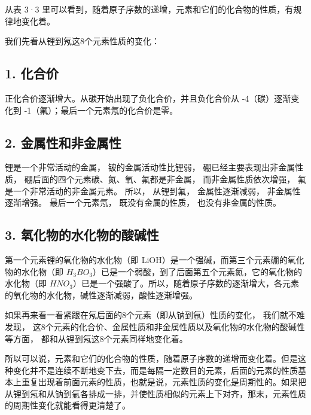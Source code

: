 从表 3·3
里可以看到，随着原子序数的递增，元素和它们的化合物的性质，有规律地变化着。

我们先看从锂到氖这8个元素性质的变化：

\subsection{1. 化合价}

正化合价逐渐增大。从碳开始出现了负化合价，并且负化合价从
-4（碳）逐渐变化到 -1（氟）；最后一个元素氖的化合价是零。

\subsection{2. 金属性和非金属性}

锂是一个非常活动的金属， 铍的金属活动性比锂弱，
硼已经主要表现出非金属性质， 硼后面的四个元素碳、氮、氧、氟都是非金属，
而非金属性质依次增强， 氟是一个非常活动的非金属元素。 所以， 从锂到氟，
金属性逐渐减弱， 非金属性逐渐增强。 最后一个元素氖， 既没有金属的性质，
也没有非金属的性质。

\subsection{3. 氧化物的水化物的酸碱性}

第一个元素锂的氧化物的水化物（即
LiOH）是一个强碱，而第三个元素硼的氧化物的水化物（即
\(H_{3}BO_{3}\)）已是一个弱酸，到了后面第五个元素氮，它的氧化物的水化物（即
\(HNO_{3}\)）已是一个强酸了。所以，随着原子序数的逐渐增大，各元素的氧化物的水化物，碱性逐渐减弱，酸性逐渐增强。

如果再来看一看紧跟在氖后面的8个元素（即从钠到氩）性质的变化，
我们就不难发现，
这8个元素的化合价、金属性质和非金属性质以及氧化物的水化物的酸碱性等方面，
都和从锂到氖这8个元素同样地变化着。

所以可以说，元素和它们的化合物的性质，随着原子序数的递增而变化着。但是这种变化并不是连续不断地变下去，而是每隔一定数目的元素，后面的元素的性质基本上重复出现着前面元素的性质，也就是说，元素性质的变化是周期性的。如果把从锂到氖和从钠到氩各排成一排，并使性质相似的元素上下对齐，那末，元素性质的周期性变化就能看得更清楚了。

{\centering
\small\setlength{\tabcolsep}{3pt}%
\par
}

